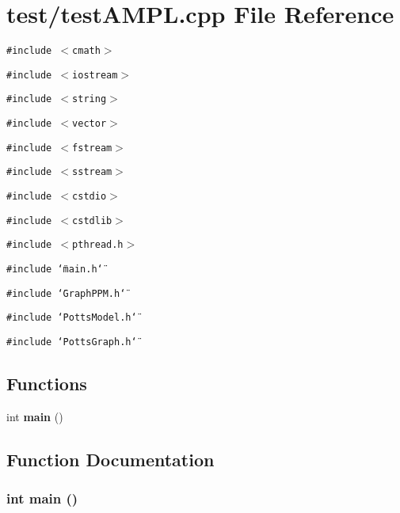 \section{test/testAMPL.cpp File Reference}
\label{testAMPL_8cpp}
{\tt \#include $<$cmath$>$}\par
{\tt \#include $<$iostream$>$}\par
{\tt \#include $<$string$>$}\par
{\tt \#include $<$vector$>$}\par
{\tt \#include $<$fstream$>$}\par
{\tt \#include $<$sstream$>$}\par
{\tt \#include $<$cstdio$>$}\par
{\tt \#include $<$cstdlib$>$}\par
{\tt \#include $<$pthread.h$>$}\par
{\tt \#include \char`\"{}main.h\char`\"{}}\par
{\tt \#include \char`\"{}GraphPPM.h\char`\"{}}\par
{\tt \#include \char`\"{}PottsModel.h\char`\"{}}\par
{\tt \#include \char`\"{}PottsGraph.h\char`\"{}}\par
\subsection*{Functions}
\begin{CompactItemize}
\item 
int {\bf main} ()
\end{CompactItemize}


\subsection{Function Documentation}
\subsubsection{\setlength{\rightskip}{0pt plus 5cm}int main ()}\label{testAMPL_8cpp_446c6b9a1a4dbab517fbb760870458a3}


